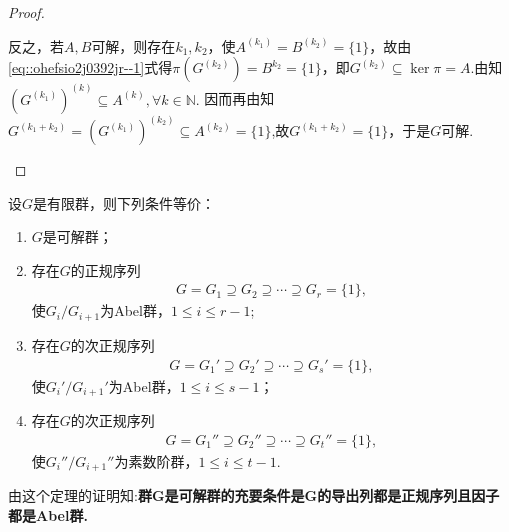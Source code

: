 \documentclass[../../main.tex]{subfiles}%
\begin{document}
\begin{proof}
\begin{enumerate}[(1)]
反之，若$A, B$可解，则存在$k_1, k_2$，使$A^{(k_1)} = B^{(k_2)} = \{1\}$，故由\eqref{eq::ohefsio2j0392jr--1}式得$\pi(G^{(k_2)}) =B^{k_2}= \{1\}$，即$G^{(k_2)} \subseteq \ker \pi=A$.由知$(G^{(k_1)})^{(k)}\subseteq A^{(k)},\forall k\in \mathbb{N}.$
因而再由知$G^{(k_1 + k_2)}=(G^{(k_1)})^{(k_2)}\subseteq A^{(k_2)}=\{1\}$,故$G^{(k_1 + k_2)} = \{1\}$，于是$G$可解.
\end{enumerate}

\end{proof}

\begin{theorem}
设$G$是有限群，则下列条件等价：
\begin{enumerate}[(1)]
\item $G$是可解群；

\item 存在$G$的正规序列
\begin{align*}
G = G_1 \supseteq G_2 \supseteq \cdots \supseteq G_r = \{1\},
\end{align*}
使$G_i/G_{i+1}$为Abel群，$1 \leqslant i \leqslant r - 1$;

\item 存在$G$的次正规序列
\begin{align*}
G = G_1' \supseteq G_2' \supseteq \cdots \supseteq G_s' = \{1\},
\end{align*}
使$G_i'/G_{i+1}'$为Abel群，$1 \leqslant i \leqslant s - 1$；
\item 存在$G$的次正规序列
\begin{align*}
G = G_1'' \supseteq G_2'' \supseteq \cdots \supseteq G_t'' = \{1\},
\end{align*}
使$G_i''/G_{i+1}''$为素数阶群，$1 \leqslant i \leqslant t - 1$.
\end{enumerate}
\end{theorem}
\begin{remark}
由这个定理的证明知:\textbf{群G是可解群的充要条件是G的导出列都是正规序列且因子都是Abel群.}
\end{remark}
\end{document}
